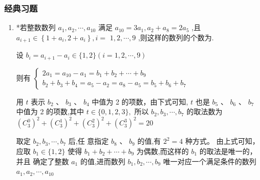 \subsubsection*{经典习题}
\begin{enumerate}
    \item *若整数数列 ${a}_{1},{a}_{2},\cdots ,{a}_{10}$ 满足 ${a}_{10} = 3{a}_{1},{a}_{2} + {a}_{8} = 2{a}_{5}$ ,且 ${a}_{i + 1} \in  \left\{  {1 + {a}_{i},2 + {a}_{i}}\right\}  ,i =$  $1,2,\cdots ,9$ ,则这样的数列的个数为.
    \begin{jieda}
        设 ${b}_{i} = {a}_{i + 1} - {a}_{i} \in  \{ 1,2\} \left( {i = 1,2,\cdots ,9}\right)$
        
        则有
        $\left\{\begin{array}{l}
             2{a}_{1} = {a}_{10} - {a}_{1} = {b}_{1} + {b}_{2} + \cdots  + {b}_{9}  \\
             {b}_{2} + {b}_{3} + {b}_{4} = {a}_{5} - {a}_{2} = {a}_{8} - {a}_{5} = {b}_{5} + {b}_{6} + {b}_{7}
        \end{array}\right.$ 
        
        用 $t$ 表示 ${b}_{2}$ 、 ${b}_{3}$ 、 ${b}_{4}$ 中值为 2 的项数，由下式可知, $t$ 也是 ${b}_{5}$ 、 ${b}_{6}$ 、 ${b}_{7}$ 中值为 2 的项数,其中
        $t \in  \{ 0,1,2,3\} ,$
        所以 ${b}_{2},{b}_{3},\cdots ,{b}_{7}$ 的取法数为 ${\left( {{C}}_{3}^{0}\right) }^{2} + {\left( {{C}}_{3}^{1}\right) }^{2} + {\left( {{C}}_{3}^{2}\right) }^{2} + {\left( {{C}}_{3}^{3}\right) }^{2} = {20}$
        
        取定 ${b}_{2},{b}_{3},\cdots ,{b}_{7}$ 后,任
        意指定 ${b}_{8}$ 、 ${b}_{9}$ 的值,有 ${2}^{2} = 4$ 种方式。
        由上式可知，应取 ${b}_{1} \in  \{ 1,2\}$ 使得 ${b}_{1} + {b}_{2} + \cdots  + {b}_{9}$ 为偶数,而这样的 ${b}_{1}$ 的取法是唯一的，并且
        确定了整数 ${a}_{1}$ 的值,进而数列 ${b}_{1},{b}_{2},\cdots ,{b}_{9}$ 唯一对应一个满足条件的数列 ${a}_{1},{a}_{2},\cdots ,{a}_{10}$


\end{jieda}
\end{enumerate}
